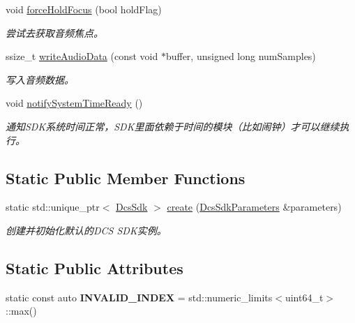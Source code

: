 \begin{DoxyCompactItemize}
void \hyperlink{classduerOSDcsSDK_1_1sdkInterfaces_1_1DcsSdk_aa9aba3850ac50a1328290fa93976bf1c}{force\+Hold\+Focus} (bool hold\+Flag)
\begin{DoxyCompactList}\small\item\em 尝试去获取音频焦点。 \end{DoxyCompactList}\item 
ssize\+\_\+t \hyperlink{classduerOSDcsSDK_1_1sdkInterfaces_1_1DcsSdk_aa84a60e7b59a83730f0c2b1c02b6fb0b}{write\+Audio\+Data} (const void $\ast$buffer, unsigned long num\+Samples)
\begin{DoxyCompactList}\small\item\em 写入音频数据。 \end{DoxyCompactList}\item 
\mbox{\label{classduerOSDcsSDK_1_1sdkInterfaces_1_1DcsSdk_ac8ec1f16c059652b63b90a68d2ed2857}} 
void \hyperlink{classduerOSDcsSDK_1_1sdkInterfaces_1_1DcsSdk_ac8ec1f16c059652b63b90a68d2ed2857}{notify\+System\+Time\+Ready} ()
\begin{DoxyCompactList}\small\item\em 通知\+S\+D\+K系统时间正常，\+S\+D\+K里面依赖于时间的模块（比如闹钟）才可以继续执行。 \end{DoxyCompactList}\end{DoxyCompactItemize}
\subsection*{Static Public Member Functions}
\begin{DoxyCompactItemize}
\item 
static std\+::unique\+\_\+ptr$<$ \hyperlink{classduerOSDcsSDK_1_1sdkInterfaces_1_1DcsSdk}{Dcs\+Sdk} $>$ \hyperlink{classduerOSDcsSDK_1_1sdkInterfaces_1_1DcsSdk_a265680194fb7399453e35e8833b1900c}{create} (\hyperlink{structduerOSDcsSDK_1_1sdkInterfaces_1_1DcsSdkParameters}{Dcs\+Sdk\+Parameters} \&parameters)
\begin{DoxyCompactList}\small\item\em 创建并初始化默认的\+D\+CS S\+D\+K实例。 \end{DoxyCompactList}\end{DoxyCompactItemize}
\subsection*{Static Public Attributes}
\begin{DoxyCompactItemize}
\item 
\mbox{\label{classduerOSDcsSDK_1_1sdkInterfaces_1_1DcsSdk_a5e3ba8eeefdeb069de0a614cce3f181e}} 
static const auto {\bfseries I\+N\+V\+A\+L\+I\+D\+\_\+\+I\+N\+D\+EX} = std\+::numeric\+\_\+limits$<$uint64\+\_\+t$>$\+::max()
\end{DoxyCompactItemize}



